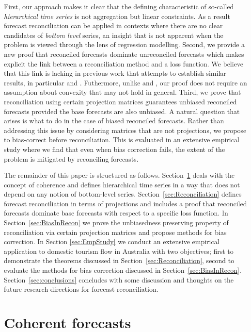 \documentclass[12pt]{article}
\theoremstyle{definition}
\begin{document}
First, our approach makes it clear that the defining characteristic of so-called \emph{hierarchical time series} is not aggregation but linear constraints. As a result forecast reconciliation can be applied in contexts where there are no clear candidates of \emph{bottom level} series, an insight that is not apparent when the problem is viewed through the lens of regression modelling. Second, we provide a new proof that reconciled forecasts dominate unreconciled forecasts which makes explicit the link between a reconciliation method and a loss function. We believe that this link is lacking in previous work that attempts to establish similar results, in particular \citet{VanErven2015a} and \citet{WicEtAl2019}. Futhermore, unlike \citet{VanErven2015a} and \citet{WicEtAl2019}, our proof does not require an assumption about convexity that may not hold in general. Third, we prove that reconciliation using certain projection matrices guarantees unbiased reconciled forecasts provided the base forecasts are also unbiased. A natural question that arises is what to do in the case of biased reconciled forecasts. Rather than addressing this issue by considering matrices that are not projections, we propose to bias-correct before reconciliation. This is evaluated in an extensive empirical study where we find that even when bias correction fails, the extent of the problem is mitigated by reconciling forecasts.

The remainder of this paper is structured as follows. Section~\ref{sec:CoheForecasts} deals with the concept of coherence and defines hierarchical time series in a way that does not depend on any notion of bottom-level series. Section~\ref{sec:Reconciliation} defines forecast reconciliation in terms of projections and includes a proof that reconciled forecasts dominate base forecasts with respect to a specific loss function. In Section~\ref{sec:BiasInRecon} we prove the unbiasedness preserving property of reconciliation via certain projection matrices and propose methods for bias correction. In Section \ref{sec:EmpStudy} we conduct an extensive empirical application to domestic tourism flow in Australia with two objectives; first to demonstrate the theorems discussed in Section~\ref{sec:Reconciliation}, second to evaluate the methods for bias correction discussed in Section~\ref{sec:BiasInRecon}. Section~\ref{sec:conclusions} concludes with some discussion and thoughts on the future research directions {\color{blue}for} forecast reconciliation.

\section{Coherent forecasts}\label{sec:CoheForecasts}
\end{document}

